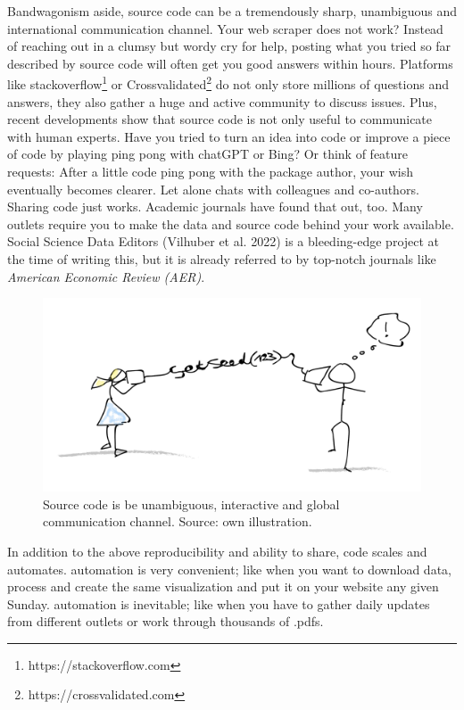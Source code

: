 \documentclass[
  12pt,
  letterpaper,
]{krantz}
\begin{document}
Bandwagonism aside, source code can be a tremendously sharp, unambiguous
and international communication channel. Your web scraper does not work?
Instead of reaching out in a clumsy but wordy cry for help, posting what
you tried so far described by source code will often get you good
answers within hours. Platforms like
stackoverflow\footnote{https://stackoverflow.com}
or Crossvalidated\footnote{https://crossvalidated.com} do not only store
millions of questions and answers, they also gather a huge and active
community to discuss issues. Plus, recent developments show that source
code is not only useful to communicate with human experts. Have you
tried to turn an idea into code or improve a piece of code by playing
ping pong with chatGPT or Bing? Or think of feature requests: After a
little code ping pong with the package author, your wish eventually
becomes clearer. Let alone chats with colleagues and co-authors. Sharing
code just works. Academic journals have found that out, too. Many
outlets require you to make the data and source code behind your work
available. Social Science Data Editors (Vilhuber et al. 2022) is a
bleeding-edge project at the time of writing this, but it is already
referred to by top-notch journals like \emph{American Economic Review
(AER)}.

\begin{figure}

{\centering \includegraphics{./images/communication.png}

}

\caption{Source code is be unambiguous, interactive and global
communication channel. Source: own illustration.}

\end{figure}

In addition to the above reproducibility and ability to share, code
scales and automates. automation is very convenient;
like when you want to download data, process and create the same
visualization and put it on your website any given Sunday.
automation is inevitable; like when you have to gather
daily updates from different outlets or work through thousands of .pdfs.
\end{document}
